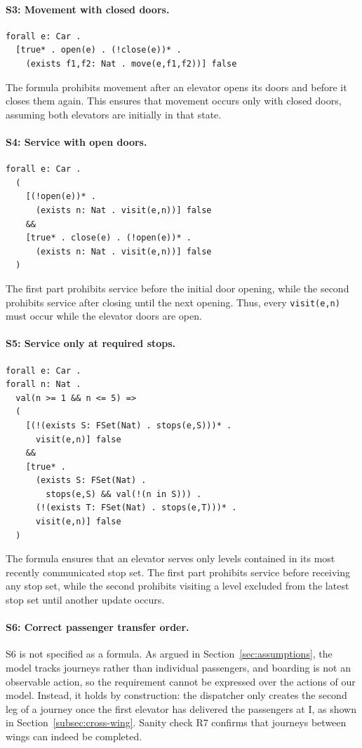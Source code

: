 \paragraph{S3: Movement with closed doors.}
\noindent \begin{lstlisting}
forall e: Car .
  [true* . open(e) . (!close(e))* .
    (exists f1,f2: Nat . move(e,f1,f2))] false
\end{lstlisting}
The formula prohibits movement after an elevator opens its doors and before it closes them again. This ensures that movement occurs only with closed doors, assuming both elevators are initially in that state.

\paragraph{S4: Service with open doors.}
\noindent \begin{lstlisting}
forall e: Car .
  (
    [(!open(e))* .
      (exists n: Nat . visit(e,n))] false
    &&
    [true* . close(e) . (!open(e))* .
      (exists n: Nat . visit(e,n))] false
  )
\end{lstlisting}
The first part prohibits service before the initial door opening, while the second prohibits service after closing until the next opening. Thus, every \texttt{visit(e,n)} must occur while the elevator doors are open. 

\paragraph{S5: Service only at required stops.}
\noindent \begin{lstlisting}
forall e: Car .
forall n: Nat .
  val(n >= 1 && n <= 5) =>
  (
    [(!(exists S: FSet(Nat) . stops(e,S)))* .
      visit(e,n)] false
    &&
    [true* .
      (exists S: FSet(Nat) .
        stops(e,S) && val(!(n in S))) .
      (!(exists T: FSet(Nat) . stops(e,T)))* .
      visit(e,n)] false
  )
\end{lstlisting}
The formula ensures that an elevator serves only levels contained in its most recently communicated stop set. The first part prohibits service before receiving any stop set, while the second prohibits visiting a level excluded from the latest stop set until another update occurs.

\paragraph{S6: Correct passenger transfer order.}
S6 is not specified as a formula. As argued in Section~\ref{sec:assumptions}, the model tracks journeys rather than individual passengers, and boarding is not an observable action, so the requirement cannot be expressed over the actions of our model. Instead, it holds by construction: the dispatcher only creates the second leg of a journey once the first elevator has delivered the passengers at I, as shown in Section~\ref{subsec:cross-wing}. Sanity check R7 confirms that journeys between wings can indeed be completed.

